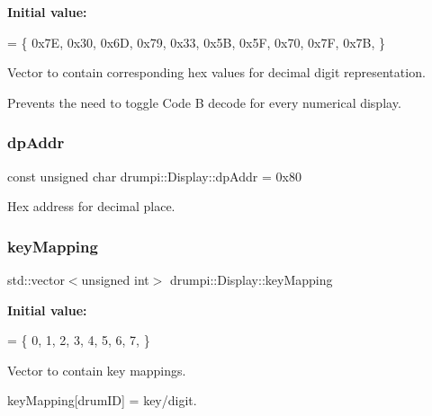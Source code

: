 {\bfseries Initial value\+:}
\begin{DoxyCode}
= \{
            0x7E, 
            0x30, 
            0x6D, 
            0x79, 
            0x33, 
            0x5B, 
            0x5F, 
            0x70, 
            0x7F, 
            0x7B, 
        \}
\end{DoxyCode}
Vector to contain corresponding hex values for decimal digit representation.

Prevents the need to toggle Code B decode for every numerical display. \mbox{\label{classdrumpi_1_1Display_a262abe3f60fd889ec627bf3e08f1468e}} 
\subsubsection{\texorpdfstring{dp\+Addr}{dpAddr}}
{\footnotesize\ttfamily const unsigned char drumpi\+::\+Display\+::dp\+Addr = 0x80\hspace{0.3cm}{\ttfamily [private]}}

Hex address for decimal place. \mbox{\label{classdrumpi_1_1Display_ae168cc9f5c514995b51c483b81f6be2b}} 
\subsubsection{\texorpdfstring{key\+Mapping}{keyMapping}}
{\footnotesize\ttfamily std\+::vector$<$unsigned int$>$ drumpi\+::\+Display\+::key\+Mapping\hspace{0.3cm}{\ttfamily [private]}}

{\bfseries Initial value\+:}
\begin{DoxyCode}
= \{
            0,  
            1,  
            2,  
            3,  
            4,  
            5,  
            6,  
            7,  
        \}
\end{DoxyCode}
Vector to contain key mappings.

key\+Mapping\mbox{[}drum\+ID\mbox{]} = key/digit. \mbox{\label{classdrumpi_1_1Display_a6edbae4cb83ea5fd2e37fb0549abec58}} 
